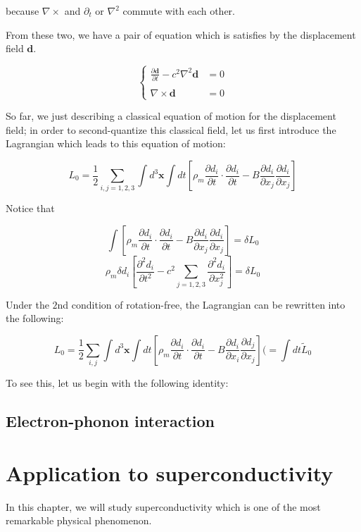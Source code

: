 ﻿\documentclass[twoside]{book}
\numberwithin{equation}{section}
\begin{document}
because $\nabla\times$ and $\partial_t$ or $\nabla^2$ commute with each other. 

From these two, we have a pair of equation which is satisfies by the displacement field $\bm{d}$. 

\[\begin{cases}
\frac{\partial\bm{d}}{\partial t} - c^2\nabla^2\bm{d} &= 0\\
\ &\ \\
\nabla\times\bm{d} &= 0
\end{cases}\]

So far, we just describing a classical equation of motion for the displacement field; in order to second-quantize this classical field, let us first introduce the Lagrangian which leads to this equation of motion:

\[L_0 = \frac{1}{2}\sum_{i,j=1,2,3}\int d^3\bm{x}\int dt\left[\rho_m\frac{\partial d_i}{\partial t}\cdot\frac{\partial d_i}{\partial t} - B\frac{\partial d_i}{\partial x_j}\frac{\partial d_i}{\partial x_j}\right]\]

Notice that

\[\int \left[\rho_m\frac{\partial d_i}{\partial t}\cdot\frac{\partial d_i}{\partial t} - B\frac{\partial d_i}{\partial x_j}\frac{\partial d_i}{\partial x_j}\right] = \delta L_0\]
\[\rho_m\delta d_i\left[\frac{\partial^2 d_i}{\partial t^2} - c^2\sum_{j = 1,2,3}\frac{\partial^2 d_i}{\partial x_j^2}\right] = \delta L_0 \]

Under the $2$nd condition of rotation-free, the Lagrangian can be rewritten into the following:

\[L_0 = \frac{1}{2}\sum_{i,j}\int d^3\bm{x}\int dt \left[\rho_m\frac{\partial d_i}{\partial t}\cdot\frac{\partial d_i}{\partial t} - B\frac{\partial d_i}{\partial x_i}\frac{\partial d_j}{\partial x_j}\right] (=\int dt \tilde{L}_0 \]

To see this, let us begin with the following identity:
\section{Electron-phonon interaction} \label{se5-2}

\chapter{Application to superconductivity}


In this chapter, we will study superconductivity which is one of the most remarkable physical phenomenon.
\end{document}
